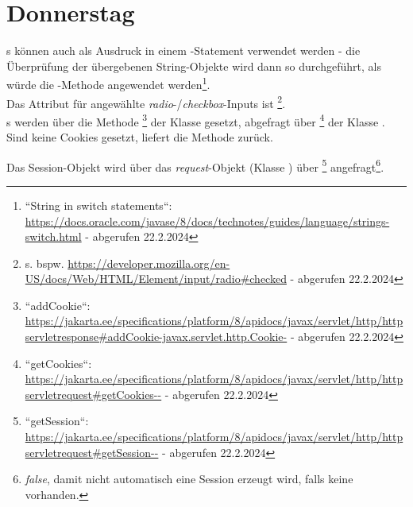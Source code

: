 \section{Donnerstag}

s können auch als Ausdruck in einem -Statement verwendet werden - die Überprüfung der übergebenen String-Objekte wird dann so durchgeführt, als würde die -Methode angewendet werden\footnote{``String in switch statements``: \url{https://docs.oracle.com/javase/8/docs/technotes/guides/language/strings-switch.html} - abgerufen 22.2.2024
}.\\


\noindent
Das Attribut für angewählte \textit{radio}-/\textit{checkbox}-Inputs ist \footnote{
s. bspw. \url{https://developer.mozilla.org/en-US/docs/Web/HTML/Element/input/radio#checked} - abgerufen 22.2.2024
}.\\

\noindent
{}s werden über die Methode \footnote{
``addCookie``: \url{https://jakarta.ee/specifications/platform/8/apidocs/javax/servlet/http/httpservletresponse#addCookie-javax.servlet.http.Cookie-} - abgerufen 22.2.2024
} der Klasse  gesetzt, abgefragt über \footnote{
``getCookies``: \url{https://jakarta.ee/specifications/platform/8/apidocs/javax/servlet/http/httpservletrequest#getCookies--} - abgerufen 22.2.2024
} der Klasse .
Sind keine Cookies gesetzt, liefert die Methode  zurück.


\noindent
Das Session-Objekt wird über das \textit{request}-Objekt (Klasse ) über \footnote{
``getSession``: \url{https://jakarta.ee/specifications/platform/8/apidocs/javax/servlet/http/httpservletrequest#getSession--} - abgerufen 22.2.2024
} angefragt\footnote{\textit{false}, damit nicht automatisch eine Session erzeugt wird, falls keine vorhanden.}.

